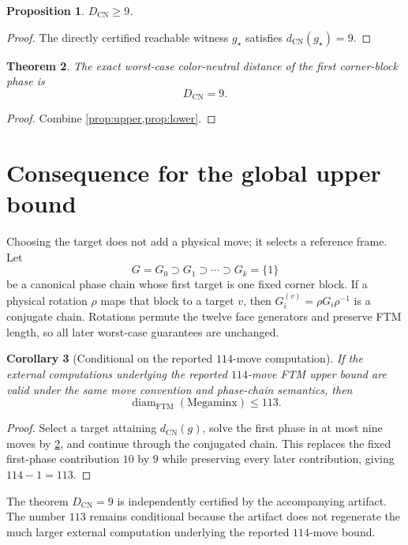 \documentclass[11pt]{article}
\newtheorem{theorem}{Theorem}
\newtheorem{corollary}[theorem]{Corollary}
\newtheorem{proposition}[theorem]{Proposition}
\theoremstyle{definition}
\newcommand{\FTM}{\mathrm{FTM}}
\newcommand{\DCN}{D_{\mathrm{CN}}}
\newcommand{\dCN}{d_{\mathrm{CN}}}
\begin{document}
\begin{proposition}\label{prop:lower}
$\DCN\ge9$.
\end{proposition}
\begin{proof}
The directly certified reachable witness $g_\star$ satisfies $\dCN(g_\star)=9$.
\end{proof}

\begin{theorem}\label{thm:main}
The exact worst-case color-neutral distance of the first corner-block phase is
\[
\boxed{\DCN=9}.
\]
\end{theorem}
\begin{proof}
Combine \cref{prop:upper,prop:lower}.
\end{proof}

\section{Consequence for the global upper bound}

Choosing the target does not add a physical move; it selects a reference frame.  Let
\[
G=G_0\supset G_1\supset\cdots\supset G_k=\{1\}
\]
be a canonical phase chain whose first target is one fixed corner block.  If a physical rotation $\rho$ maps that block to a target $v$, then $G_i^{(v)}=\rho G_i\rho^{-1}$ is a conjugate chain.  Rotations permute the twelve face generators and preserve FTM length, so all later worst-case guarantees are unchanged.

\begin{corollary}[Conditional on the reported $114$-move computation]\label{cor:113}
If the external computations underlying the reported $114$-move FTM upper bound are valid under the same move convention and phase-chain semantics, then
\[
\operatorname{diam}_{\FTM}(\mathrm{Megaminx})\le113.
\]
\end{corollary}
\begin{proof}
Select a target attaining $\dCN(g)$, solve the first phase in at most nine moves by \cref{thm:main}, and continue through the conjugated chain.  This replaces the fixed first-phase contribution $10$ by $9$ while preserving every later contribution, giving $114-1=113$.
\end{proof}

The theorem $\DCN=9$ is independently certified by the accompanying artifact.  The number $113$ remains conditional because the artifact does not regenerate the much larger external computation underlying the reported $114$-move bound.
\end{document}
